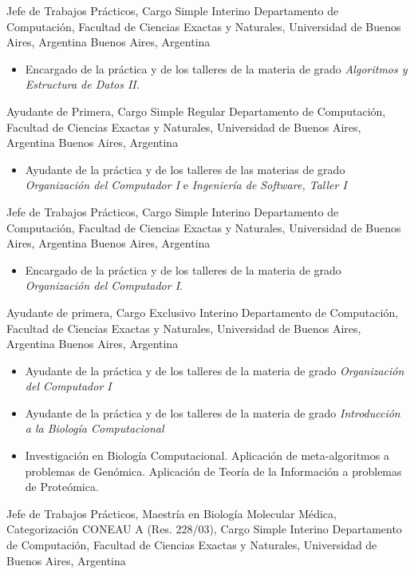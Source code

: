         {Jefe de Trabajos Prácticos, Cargo Simple Interino}
	{Departamento de Computación, Facultad de Ciencias Exactas y Naturales, Universidad de Buenos Aires, Argentina}
	{Buenos Aires, Argentina}
	{}
	{\begin{itemize}
	\item Encargado de la práctica y de los talleres de la materia de grado \emph{Algoritmos y Estructura de Datos II.}
	\end{itemize}}
	{Ayudante de Primera, Cargo Simple Regular}
	{Departamento de Computación, Facultad de Ciencias Exactas y Naturales, Universidad de Buenos Aires, Argentina}
	{Buenos Aires, Argentina}
	{}
	{\begin{itemize}
	\item Ayudante de la práctica y de los talleres de las materias de grado \emph{Organización del Computador I} e \emph{Ingeniería de Software, Taller I}
	\end{itemize}}
        {Jefe de Trabajos Prácticos, Cargo Simple Interino}
	{Departamento de Computación, Facultad de Ciencias Exactas y Naturales, Universidad de Buenos Aires, Argentina}
	{Buenos Aires, Argentina}
	{}
	{\begin{itemize}
	\item Encargado de la práctica y de los talleres de la materia de grado \emph{Organización del Computador I}.
	\end{itemize}}
	{Ayudante de primera, Cargo Exclusivo Interino}
	{Departamento de Computación, Facultad de Ciencias Exactas y Naturales, Universidad de Buenos Aires, Argentina}
	{Buenos Aires, Argentina}
	{}
	{\begin{itemize}
	\item Ayudante de la práctica y de los talleres de la materia de grado \emph{Organización del Computador I}
	\item Ayudante de la práctica y de los talleres de la materia de grado \emph{Introducción a la Biología Computacional}
	\item Investigación en Biología Computacional. Aplicación de meta-algoritmos a problemas de Genómica. Aplicación de Teoría de la Información a problemas de Proteómica.
	\end{itemize}}
	{Jefe de Trabajos Prácticos, Maestría en Biología Molecular Médica, Categorización CONEAU A (Res. 228/03), Cargo Simple Interino}
	{Departamento de Computación, Facultad de Ciencias Exactas y Naturales, Universidad de Buenos Aires, Argentina}
